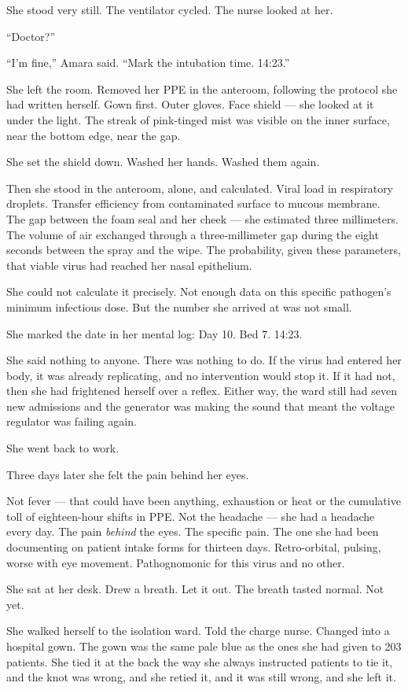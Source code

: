 \documentclass[11pt]{article}
\begin{document}
She stood very still. The ventilator cycled. The nurse looked at her.

``Doctor?''

``I'm fine,'' Amara said. ``Mark the intubation time. 14:23.''

She left the room. Removed her PPE in the anteroom, following the protocol she had written herself. Gown first. Outer gloves. Face shield --- she looked at it under the light. The streak of pink-tinged mist was visible on the inner surface, near the bottom edge, near the gap.

She set the shield down. Washed her hands. Washed them again.

Then she stood in the anteroom, alone, and calculated. Viral load in respiratory droplets. Transfer efficiency from contaminated surface to mucous membrane. The gap between the foam seal and her cheek --- she estimated three millimeters. The volume of air exchanged through a three-millimeter gap during the eight seconds between the spray and the wipe. The probability, given these parameters, that viable virus had reached her nasal epithelium.

She could not calculate it precisely. Not enough data on this specific pathogen's minimum infectious dose. But the number she arrived at was not small.

She marked the date in her mental log: Day 10. Bed 7. 14:23.

She said nothing to anyone. There was nothing to do. If the virus had entered her body, it was already replicating, and no intervention would stop it. If it had not, then she had frightened herself over a reflex. Either way, the ward still had seven new admissions and the generator was making the sound that meant the voltage regulator was failing again.

She went back to work.

Three days later she felt the pain behind her eyes.

Not fever --- that could have been anything, exhaustion or heat or the cumulative toll of eighteen-hour shifts in PPE. Not the headache --- she had a headache every day. The pain \emph{behind} the eyes. The specific pain. The one she had been documenting on patient intake forms for thirteen days. Retro-orbital, pulsing, worse with eye movement. Pathognomonic for this virus and no other.

She sat at her desk. Drew a breath. Let it out. The breath tasted normal. Not yet.

She walked herself to the isolation ward. Told the charge nurse. Changed into a hospital gown. The gown was the same pale blue as the ones she had given to 203 patients. She tied it at the back the way she always instructed patients to tie it, and the knot was wrong, and she retied it, and it was still wrong, and she left it.
\end{document}
